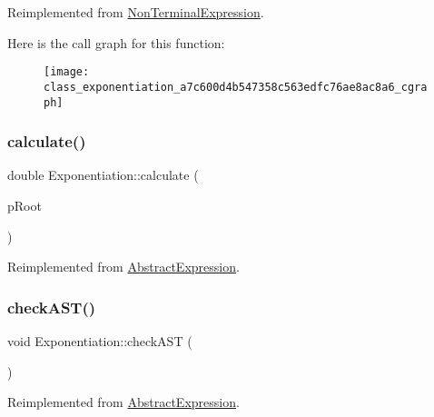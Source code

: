 Reimplemented from \mbox{\hyperlink{class_non_terminal_expression_aa65153b69523e01d86893f6d7b7fc480}{Non\+Terminal\+Expression}}.

Here is the call graph for this function\+:
\nopagebreak
\begin{figure}[H]
\begin{center}
\leavevmode
\texttt{[image: class\_exponentiation\_a7c600d4b547358c563edfc76ae8ac8a6\_cgraph]}
\end{center}
\end{figure}
\mbox{\label{class_exponentiation_ab04f25d16cb5a51d71acdb9ac600c745}} 
\subsubsection{\texorpdfstring{calculate()}{calculate()}}
{\footnotesize\ttfamily double Exponentiation\+::calculate (\begin{DoxyParamCaption}\item[{std\+::unique\+\_\+ptr$<$ \mbox{\hyperlink{class_abstract_expression}{Abstract\+Expression}} $>$ \&}]{p\+Root }\end{DoxyParamCaption})\hspace{0.3cm}{\ttfamily [virtual]}}



Reimplemented from \mbox{\hyperlink{class_abstract_expression_a1c9871ee669668c2eb9f1f1a7d6f5d32}{Abstract\+Expression}}.

\mbox{\label{class_exponentiation_ae7f0d75fef03d8121d812c591ba6e43f}} 
\subsubsection{\texorpdfstring{checkAST()}{checkAST()}}
{\footnotesize\ttfamily void Exponentiation\+::check\+A\+ST (\begin{DoxyParamCaption}{ }\end{DoxyParamCaption})\hspace{0.3cm}{\ttfamily [virtual]}}



Reimplemented from \mbox{\hyperlink{class_abstract_expression_a703563fdf65d18ce4b7f2817e2ff4581}{Abstract\+Expression}}.

